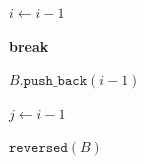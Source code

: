 \documentclass[12pt]{article}
\begin{document}
\begin{enumerate}
\begin{enumerate}
\begin{algorithm}
\begin{algorithmic}
            \State $i \gets i - 1$
            \EndWhile

            \vspace{3mm}

            \State \textbf{break}
            \EndIf

            \vspace{3mm}

            \State $B.\texttt{push\_back}(i - 1)$ 

            \State $j \gets i - 1$
            \EndWhile

            \vspace{3mm}

            \State \Return $\texttt{reversed}(B)$
            \EndProcedure
          \end{algorithmic}
        \end{algorithm}
    \end{enumerate}
\end{enumerate}
\end{document}
